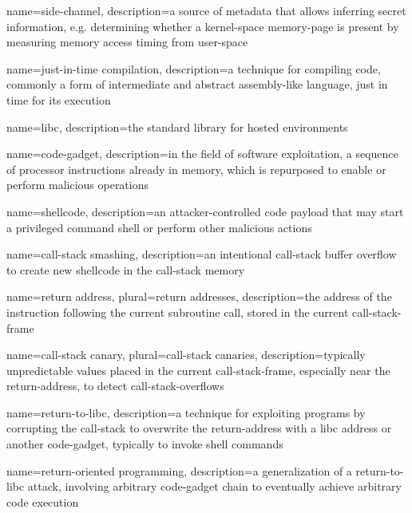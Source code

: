 {
  name={side-channel},
  description={a source of metadata that allows inferring secret information, e.g. determining whether a \gls{kernel-space} \gls{memory-page} is present by measuring memory access timing from \gls{user-space}}
}

{
  name={just-in-time compilation},
  description={a technique for compiling code, commonly a form of intermediate and abstract assembly-like language, just in time for its execution}
}

{
  name={libc},
  description={the  standard library for hosted environments}
}

{
  name={code-gadget},
  description={in the field of software exploitation, a sequence of processor instructions already in memory, which is repurposed to enable or perform malicious operations}
}

{
  name={shellcode},
  description={an attacker-controlled code payload that may start a privileged command shell or perform other malicious actions}
}

{
  name={\gls{call-stack} smashing},
  description={an intentional \gls{call-stack} buffer overflow to create new \gls{shellcode} in the \gls{call-stack} memory}
}

{
  name={return address},
  plural={return addresses},
  description={the address of the instruction following the current subroutine call, stored in the current \gls{call-stack-frame}}
}

{
  name={\gls{call-stack} canary},
  plural={\gls{call-stack} canaries},
  description={typically unpredictable values placed in the current \gls{call-stack-frame}, especially near the \gls{return-address}, to detect \glspl{call-stack-overflow}}
}

{
  name={return-to-libc},
  description={a technique for exploiting programs by corrupting the \gls{call-stack} to overwrite the \gls{return-address} with a \gls{libc} address or another \gls{code-gadget}, typically to invoke shell commands}
}

{
  name={return-oriented programming},
  description={a generalization of a \gls{return-to-libc} attack, involving arbitrary \gls{code-gadget} chain to eventually achieve arbitrary code execution}
}

